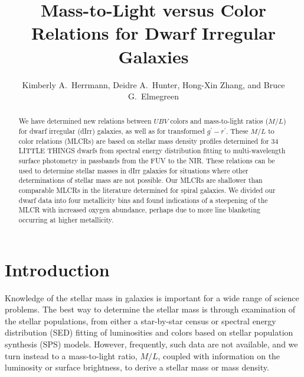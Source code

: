 \documentclass[12pt]{emulateapj}
\begin{document}
\title{Mass-to-Light versus Color Relations for Dwarf Irregular Galaxies}

\author{Kimberly A.\ Herrmann, Deidre A.\ Hunter, 
Hong-Xin Zhang, and Bruce G.\ Elmegreen}


\begin{abstract}
We have determined new relations between $UBV$ colors and mass-to-light ratios ($M/L$) for dwarf irregular (dIrr) galaxies, as well as for transformed $g^\prime - r^\prime$.  These $M/L$ to color relations (MLCRs) are based on stellar mass density profiles determined for 34 LITTLE THINGS dwarfs from spectral energy distribution fitting to multi-wavelength surface photometry in passbands from the FUV to the NIR.  These relations can be used to determine stellar masses in dIrr galaxies for situations where other determinations of stellar mass are not possible.  Our MLCRs are shallower than comparable MLCRs in the literature determined for spiral galaxies.  We divided our dwarf data into four metallicity bins and found indications of a steepening of the MLCR with increased oxygen abundance, perhaps due to more line blanketing occurring at higher metallicity.
\end{abstract}


\section{Introduction} \label{sec-intro}
Knowledge of the stellar mass in galaxies is important for a wide range of science problems. The best way to determine the stellar mass is through examination of the stellar populations, from either a star-by-star census or spectral energy distribution (SED) fitting of luminosities and colors based on stellar population synthesis (SPS) models. However, frequently, such data are not available, and we turn instead to a mass-to-light ratio, $M/L$, coupled with information on the luminosity or surface brightness, to derive a stellar mass or mass density.
\end{document}
